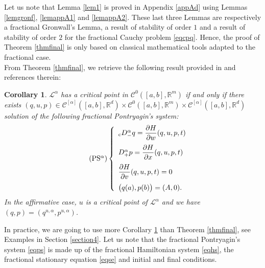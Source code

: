 \documentclass[english,11pt,reqno]{smfart}
\newtheorem{corollary}[theorem]{Corollary}
\newcommand{\R}{\mathbb{R}}
\newcommand{\LL}{\mathcal{L}}
\newcommand{\CC}{\mathscr{C}}
\newcommand{\cDM}{{}_{{\rm c}} D^\alpha_-}
\newcommand{\DP}{D^\alpha_+}
\begin{document}
Let us note that Lemma \ref{lem1} is proved in Appendix \ref{appAd} using Lemmas \ref{lemgronf}, \ref{lemappA1} and \ref{lemappA2}. These last three Lemmas are respectively a fractional Gronwall's Lemma, a result of stability of order $1$ and a result of stability of order $2$ for the fractional Cauchy problem \eqref{eqcpq}. Hence, the proof of Theorem \ref{thmfinal} is only based on classical mathematical tools adapted to the fractional case. \\

From Theorem \ref{thmfinal}, we retrieve the following result provided in \cite{agra2,agra3,torr,torr2,jeli} and references therein:
\begin{corollary}\label{corfinal}
$\LL^\alpha$ has a critical point in $\CC^0 ([a,b],\R^m)$ if and only if there exists $(q,u,p) \in \CC^{[\alpha]} ([a,b],\R^d) \times \CC^0 ([a,b],\R^m) \times \CC^{[\alpha]} ([a,b],\R^d)$ solution of the following \textit{fractional Pontryagin's system}:
\begin{equation}\tag{PS${}^\alpha $}\label{eqps}
 \left\lbrace \begin{array}{l}
 		\cDM q = \dfrac{\partial H}{\partial w} (q,u,p,t) \\[10pt]
 		\DP p = \dfrac{\partial H}{\partial x} (q,u,p,t) \\[10pt]
	    \dfrac{\partial H}{\partial v} (q,u,p,t) = 0 \\[10pt]
	    \big( q(a),p(b) \big) = ( A,0 ).
        \end{array}
\right.
\end{equation}
In the affirmative case, $u$ is a critical point of $\LL^\alpha$ and we have $(q,p) = (q^{u,\alpha},p^{u,\alpha})$.
\end{corollary}
In practice, we are going to use more Corollary \ref{corfinal} than Theorem \ref{thmfinal}, see Examples in Section \ref{section4}. Let us note that the fractional Pontryagin's system \eqref{eqps} is made up of the fractional Hamiltonian system \eqref{eqhs}, the fractional stationary equation \eqref{eqse} and initial and final conditions. 
\end{document}
